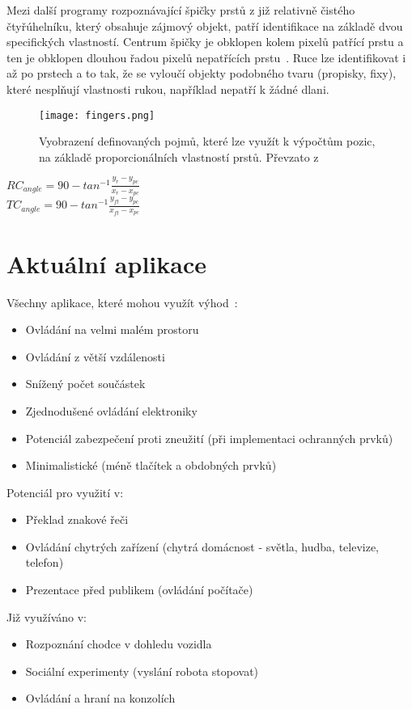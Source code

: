 Mezi další programy rozpoznávající špičky prstů z již relativně čistého čtyřúhelníku, který obsahuje zájmový objekt, patří identifikace na základě dvou specifických vlastností. Centrum špičky je obklopen kolem pixelů patřící prstu a ten je obklopen dlouhou řadou pixelů nepatřících prstu~\cite{14}. Ruce lze identifikovat i až po prstech a to tak, že se vyloučí objekty podobného tvaru (propisky, fixy), které nesplňují vlastnosti rukou, například nepatří k žádné dlani.

\begin{figure}[h]
\centering
\texttt{[image: fingers.png]}
\caption{Vyobrazení definovaných pojmů, které lze využít k výpočtům pozic, na základě proporcionálních vlastností prstů.
Převzato z ~\cite{13} }

\end{figure}
\begin{center}
$RC_{angle} = 90 - tan^{-1} \frac{y_{r}-y_{pc}}{x_{r} - x_{pc}}$ \\
$TC_{angle} = 90 - tan^{-1} \frac{y_{ft}-y_{pc}}{x_{ft} - x_{pc}}$ 
\end{center}
\newpage
\section{Aktuální aplikace}
Všechny aplikace, které mohou využít výhod~\cite{14}:
\begin{itemize}
\item Ovládání na velmi malém prostoru
\item Ovládání z větší vzdálenosti
\item Snížený počet součástek
\item Zjednodušené ovládání elektroniky
\item Potenciál zabezpečení proti zneužití (při implementaci ochranných prvků)
\item Minimalistické (méně tlačítek a obdobných prvků)\\
\end{itemize}
Potenciál pro využití v:
\begin{itemize}
\item Překlad znakové řeči
\item Ovládání chytrých zařízení (chytrá domácnost - světla, hudba, televize, telefon)
\item Prezentace před publikem (ovládání počítače)
\\
\end{itemize}
Již využíváno v:
\begin{itemize}
\item Rozpoznání chodce v dohledu vozidla
\item Sociální experimenty (vyslání robota stopovat)
\item Ovládání a hraní na konzolích
\end{itemize}

